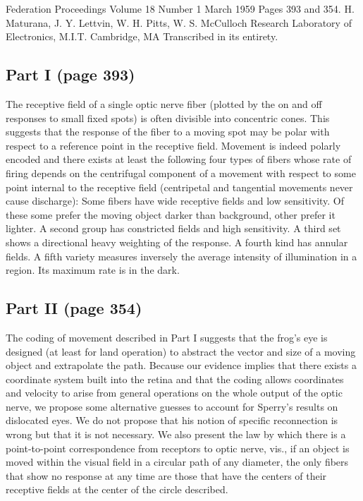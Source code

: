 Federation Proceedings Volume 18 Number 1 March 1959 Pages 393 and 354.
H. Maturana, J. Y. Lettvin, W. H. Pitts, W. S. McCulloch
Research Laboratory of Electronics, M.I.T. Cambridge, MA
Transcribed in its entirety.

\subsection{Part I (page 393)}
The receptive field of a single optic nerve fiber
(plotted by the on and off responses to small fixed spots)
is often divisible into concentric cones.
This suggests that the response of the fiber to a moving spot
may be polar with respect to a reference point in the receptive field.
Movement is indeed polarly encoded and there exists
at least the following four types of fibers whose rate of firing depends on
the centrifugal component of a movement
with respect to some point internal to the receptive field
(centripetal and tangential movements never cause discharge):
Some fibers have wide receptive fields and low sensitivity.
Of these some prefer the moving object darker than background,
other prefer it lighter.
A second group has constricted fields and high sensitivity.
A third set shows a directional heavy weighting of the response.
A fourth kind has annular fields.
A fifth variety measures inversely
the average intensity of illumination in a region.
Its maximum rate is in the dark.

\subsection{Part II (page 354)}
The coding of movement described in Part I
suggests that the frog's eye is designed
(at least for land operation)
to abstract the vector and size of a moving object
and extrapolate the path.
Because our evidence implies that there exists a coordinate system
built into the retina and that the coding allows coordinates and velocity
to arise from general operations on the whole output of the optic nerve,
we propose some alternative guesses to account for
Sperry's results on dislocated eyes.
We do not propose that his notion of specific reconnection is wrong
but that it is not necessary.
We also present the law by which there is a point-to-point correspondence
from receptors to optic nerve, vis.,
if an object is moved within the visual field
in a circular path of any diameter,
the only fibers that show no response at any time
are those that have the centers of their receptive fields
at the center of the circle described.
